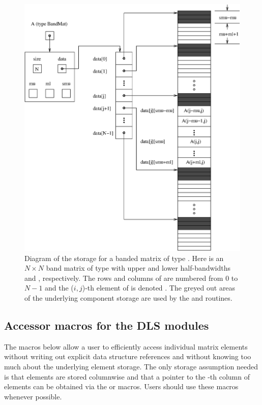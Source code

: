 \begin{figure}
\centerline{\includegraphics[width=4.5 in]{bandmat}}
\caption[Diagram of the storage for a banded matrix of type ]
  {Diagram of the storage for a banded matrix of type . Here  is an
  $N \times N$ band matrix of type  with upper and lower half-bandwidths 
  and , respectively. The rows and columns of  are numbered from $0$ to $N-1$
  and the ($i,j$)-th element of  is denoted . The greyed out areas of
  the underlying component storage are used by the  and
   routines.}\label{f:bandmat}
\end{figure}

\subsection{Accessor macros for the DLS modules}

The macros below allow a user to efficiently access individual matrix           
elements without writing out explicit data structure           
references and without knowing too much about the underlying   
element storage. The only storage assumption needed is that    
elements are stored columnwise and that a pointer to the -th 
column of elements can be obtained via the  or  macros.    
Users should use these macros whenever possible.               


